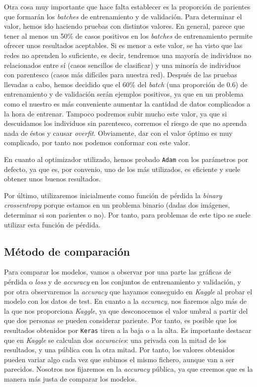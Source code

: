 \documentclass[11pt,a4paper]{article}
\begin{document}
Otra cosa muy importante que hace falta establecer es la proporción de parientes que formarán los \textit{batches}
de entrenamiento y de validación. Para determinar el valor, hemos ido haciendo pruebas con distintos valores. En
general, parece que tener al menos un 50\% de casos positivos en los \textit{batches} de entrenamiento permite
ofrecer unos resultados aceptables. Si es menor a este valor, se ha visto que las redes no aprenden lo suficiente,
es decir, tendremos una mayoría de individuos no relacionados entre sí (casos sencillos de clasificar) y una minoría
de individuos con parentesco (casos más difíciles para nuestra red). Después de las pruebas llevadas a cabo, hemos
decidido que el 60\% del \textit{batch} (una proporción de 0.6) de entrenamiento y de validación serán ejemplos
positivos, ya que en un problema como el nuestro es más conveniente aumentar la cantidad de datos complicados a
la hora de entrenar. Tampoco podremos subir mucho este valor, ya que si descuidamos los individuos sin parentesco,
corremos el riesgo de que no aprenda nada de éstos y causar \textit{overfit}. Obviamente, dar con el valor óptimo
es muy complicado, por tanto nos podemos conformar con este valor.

En cuanto al optimizador utilizado, hemos probado \texttt{Adam} con los parámetros por defecto,
ya que es, por convenio, uno de los más utilizados, es eficiente y suele obtener unos buenos resultados.

Por último, utilizaremos inicialmente como función de pérdida la \textit{binary crossentropy} porque estamos en un
problema binario (dadas dos imágenes, determinar si son parientes o no). Por tanto, para problemas de este tipo
se suele utilizar esta función de pérdida.

\subsection{Método de comparación}

Para comparar los modelos, vamos a observar por una parte las gráficas de pérdida o \textit{loss} y de
\textit{accuracy} en los conjuntos de entrenamiento y validación, y por otra observaremos la \textit{accuracy}
que hayamos conseguido en \textit{Kaggle} al probar el modelo con los datos de test. En cuanto a la \textit{accuracy},
nos fiaremos algo más de la que nos proporciona \textit{Kaggle}, ya que desconocemos el valor umbral a partir
del que dos personas se pueden considerar pariente. Por tanto, es posible que los resultados obtenidos por
\texttt{Keras} tiren a la baja o a la alta. Es importante destacar que en \textit{Kaggle} se calculan dos
\textit{accuracies}: una privada con la mitad de los resultados, y una pública con la otra mitad. Por tanto,
los valores obtenidos pueden variar algo cada vez que subimos el mismo fichero, aunque van a ser parecidos.
Nosotros nos fijaremos en la \textit{accuracy} pública, ya que creemos que es la manera más justa de comparar
los modelos.
\end{document}
